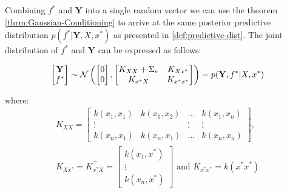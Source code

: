 
%


Combining $f^{\ast}$ and $\mathbf{Y}$ into a single random vector we can use the theorem \ref{thrm:Gaussian-Conditioning}
to arrive at the same posterior predictive distribution
$p(f^{\ast} | \mathbf{Y}, X, x^{\ast})$ as presented in \ref{def:predictive-dist}.
The joint distribution of $f^{\ast}$ and $\mathbf{Y}$ can be expressed as follows:

\begin{gather}
    \begin{bmatrix}
        \mathbf{Y} \\
        f^{\ast}
    \end{bmatrix}
    \sim \operatorname{\mathcal{N}} \left(
        \begin{bmatrix}
        0 \\
        0
        \end{bmatrix},
        \begin{bmatrix}
        K_{XX} + \Sigma_e & K_{Xx^{\ast}} \\
        K_{x^{\ast}X} & K_{x^{\ast}x^{\ast}}
        \end{bmatrix}
        \right)
    = p(\mathbf{Y}, f^{\ast}| X, x^{\ast})
\end{gather}

where:
\begin{gather*}
    K_{XX} =
    \begin{bmatrix}
        k(x_1, x_1) & k(x_1, x_2) & \dots & k(x_1, x_n)\\
        \vdots  &  & \vdots  & \vdots \\
        k(x_n, x_1)  & k(x_n, x_1) & \dots  & k(x_n, x_n)
    \end{bmatrix}, \\
    K_{Xx^{\ast}} = K_{x^{\ast}X}^{\top} =
    \begin{bmatrix}
        k(x_1, x^{\ast}) \\
        \vdots \\
        k(x_n,  x^{\ast})
    \end{bmatrix} \text{ and }
    K_{x^{\ast}x^{\ast}} = k(x^{\ast}x^{\ast})
\end{gather*}

